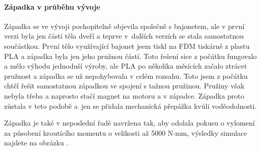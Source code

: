 \paragraph{Západka v průběhu vývoje}

Západka se ve vývoji pochopitelně objevila společně s bajonetem, ale v první verzi byla jen částí těla dveří a teprve v~dalších verzích se stala
samostatnou součástkou. První tělo využívající bajonet jsem tiskl na FDM tiskárně z plastu PLA a západka byla jen jeho pružnou částí. Toto řešení sice 
z počátku fungovalo a mělo výhodu jednoduší výroby, ale PLA po několika měsících začalo ztrácet pružnost a západka se už nepohybovala v celém rozsahu.
Toto jsem z počátku chtěl řešit samostatnou západkou ve spojení s tažnou pružinou. Pružiny však nebyla třeba a naprosto stačí magnet na motoru a v západce.
Západka proto zůstala v teto podobě a~jen se přidala mechanická přepážka kvůli voděodolnosti. 

Západka je také v neposlední řadě navržena tak, aby odolala pokusu o vylomení za působení kroutícího momentu o velikosti až 5000 N$\cdot$mm, výsledky simulace najdete 
na obrázku .
